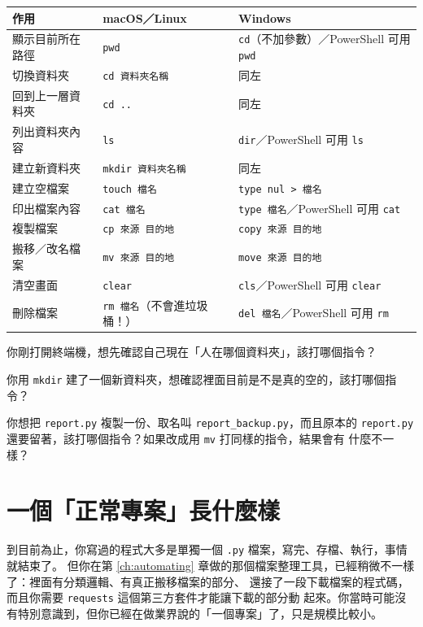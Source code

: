 \begin{center}
\begin{tabular}{@{}lll@{}}
\toprule
作用 & macOS／Linux & Windows \\
\midrule
顯示目前所在路徑 & \texttt{pwd} & \texttt{cd}（不加參數）／PowerShell 可用 \texttt{pwd} \\
切換資料夾 & \texttt{cd 資料夾名稱} & 同左 \\
回到上一層資料夾 & \texttt{cd ..} & 同左 \\
列出資料夾內容 & \texttt{ls} & \texttt{dir}／PowerShell 可用 \texttt{ls} \\
建立新資料夾 & \texttt{mkdir 資料夾名稱} & 同左 \\
建立空檔案 & \texttt{touch 檔名} & \texttt{type nul > 檔名} \\
印出檔案內容 & \texttt{cat 檔名} & \texttt{type 檔名}／PowerShell 可用 \texttt{cat} \\
複製檔案 & \texttt{cp 來源 目的地} & \texttt{copy 來源 目的地} \\
搬移／改名檔案 & \texttt{mv 來源 目的地} & \texttt{move 來源 目的地} \\
清空畫面 & \texttt{clear} & \texttt{cls}／PowerShell 可用 \texttt{clear} \\
刪除檔案 & \texttt{rm 檔名}（不會進垃圾桶！） & \texttt{del 檔名}／PowerShell 可用 \texttt{rm} \\
\bottomrule
\end{tabular}
\end{center}

\begin{drills}[label=drills:cli-basics]
\item 你剛打開終端機，想先確認自己現在「人在哪個資料夾」，該打哪個指令？
\item 你用 \texttt{mkdir} 建了一個新資料夾，想確認裡面目前是不是真的空的，該打哪個指令？
\item 你想把 \texttt{report.py} 複製一份、取名叫 \texttt{report\_backup.py}，而且原本的
\texttt{report.py} 還要留著，該打哪個指令？如果改成用 \texttt{mv} 打同樣的指令，結果會有
什麼不一樣？
\end{drills}

\section{一個「正常專案」長什麼樣}
\label{sec:project-anatomy}

到目前為止，你寫過的程式大多是單獨一個 \texttt{.py} 檔案，寫完、存檔、執行，事情就結束了。
但你在第 \ref{ch:automating} 章做的那個檔案整理工具，已經稍微不一樣了：裡面有分類邏輯、有真正搬移檔案的部分、
還接了一段下載檔案的程式碼，而且你需要 \texttt{requests} 這個第三方套件才能讓下載的部分動
起來。你當時可能沒有特別意識到，但你已經在做業界說的「一個專案」了，只是規模比較小。

